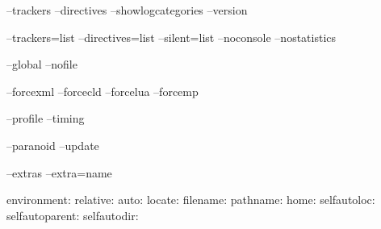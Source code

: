 \page

\StartSteps

\startsubject[title=Information about extra control]

    \starttyping
    --trackers
    --directives
    --showlogcategories
    --version
    \stoptyping \FlushStep

\stopsubject

\startsubject[title=Controlling the machinery]

    \starttyping
    --trackers=list
    --directives=list
    --silent=list
    --noconsole
    --nostatistics
    \stoptyping \FlushStep

\stopsubject

\StopSteps

\page

\StartSteps

\startsubject[title=When no local file is used]

    \starttyping
    --global
    --nofile
    \stoptyping \FlushStep

\stopsubject

\startsubject[title=When the automatics recognition doesn't work]

    \starttyping
    --forcexml
    --forcecld
    --forcelua
    --forcemp
    \stoptyping \FlushStep

\stopsubject

\StopSteps

\page

\StartSteps

\startsubject[title=Only handy for development (or me)]

    \starttyping
    --profile
    --timing
    \stoptyping \FlushStep

\stopsubject

\startsubject[title=Forget about these]

    \starttyping
    --paranoid
    --update
    \stoptyping \FlushStep

\stopsubject

\startsubject[title=Some hidden treasures]

    \starttyping
    --extras
    --extra=name
    \stoptyping \FlushStep

\stopsubject

\StopSteps

\page

\StartSteps

\startsubject[title=Arguments can be prefixed]

    \starttyping
    environment:
    relative:
    auto:
    locate:
    filename:
    pathname:
    home:
    selfautoloc:
    selfautoparent:
    selfautodir:
    \stoptyping \FlushStep

